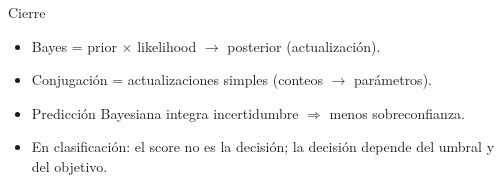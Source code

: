 \begin{frame}{Cierre}

\begin{itemize}
  \item Bayes = prior \(\times\) likelihood \(\rightarrow\) posterior (actualización).
  \item Conjugación = actualizaciones simples (conteos \(\rightarrow\) parámetros).
  \item Predicción Bayesiana integra incertidumbre \(\Rightarrow\) menos sobreconfianza.
  \item En clasificación: el score no es la decisión; la decisión depende del umbral y del objetivo.
\end{itemize}
\end{frame}
